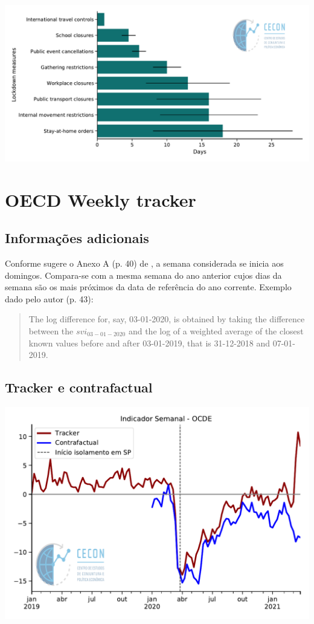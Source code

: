 \documentclass{SelfArx}
\begin{document}
\begin{center}
\includegraphics[width=.9\linewidth]{./figs/IMF/Lock_measures.pdf}
\end{center}

\section*{OECD Weekly tracker}
\label{sec:org1ba5099}
\subsection*{Informações adicionais}
\label{sec:org335b303}

Conforme sugere o Anexo A (p. 40) de \textcite{woloszko_2020_Tracking}, a semana considerada se inicia aos domingos.
Compara-se com a mesma semana do ano anterior cujos dias da semana são os mais próximos da data de referência do ano corrente.
Exemplo dado pelo autor (p. 43):

\begin{quote}
The log difference for, say, 03-01-2020, is obtained by taking the difference between the \(svi_{03-01-2020}\) and the log of a weighted average of the closest known values before and after 03-01-2019, that is 31-12-2018 and 07-01-2019.
\end{quote}


\subsection*{Tracker e contrafactual}
\label{sec:org405d9d1}
\begin{center}
\includegraphics[width=.9\linewidth]{./figs/Granulares/OCDE_Semanal.pdf}
\end{center}
\end{document}
